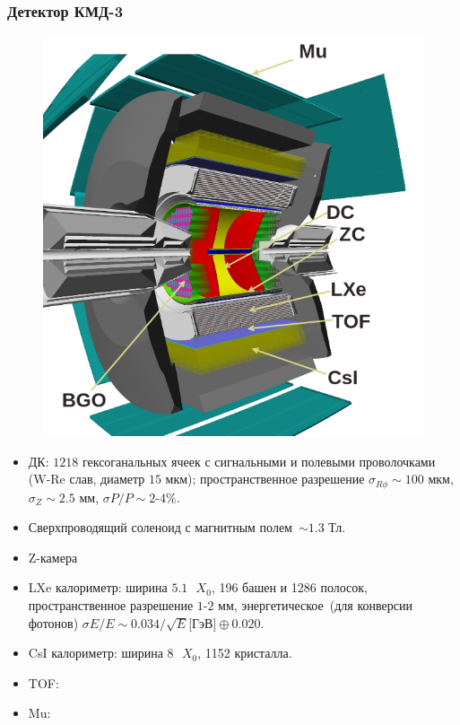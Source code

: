 \documentclass{beamer}
\begin{document}
\begin{frame}
  \frametitle{Детектор КМД-3}
  \begin{minipage}[t]{0.4\linewidth}
    \begin{figure}
      \includegraphics[width=\linewidth]{figures/cmd3.png}
    \end{figure}
  \end{minipage}
  \begin{minipage}[t]{0.55\linewidth}
    \scriptsize
    \begin{itemize}
    \item ДК: $1218$ гексоганальных ячеек с сигнальными и полевыми проволочками
      (W-Re слав, диаметр $15\text{ мкм}$); пространственное разрешение
      $\sigma_{R\phi}\sim{100}\text{ мкм}$, $\sigma_{Z}\sim{2.5}\text{ мм}$, $\sigma{P}/P\sim{2}\text{-}4\%$.
    \item Сверхпроводящий соленоид с магнитным полем~$\sim{1.3}\text{ Тл}$.
    \item Z-камера
    \item LXe калориметр: ширина $5.1\text{ }X_0$, 196 башен и 1286 полосок,
      пространственное разрешение $1$-$2\text{ мм}$, энергетическое~(для
      конверсии фотонов) $\sigma{E}/E\sim 0.034/\sqrt{E}\text{[ГэВ]}\oplus{0.020}$.
    \item CsI калориметр: ширина $8\text{ }X_0$, 1152 кристалла.
    \item TOF: %
    \item Mu: %
    \end{itemize}
  \end{minipage}
\end{frame}
\end{document}
